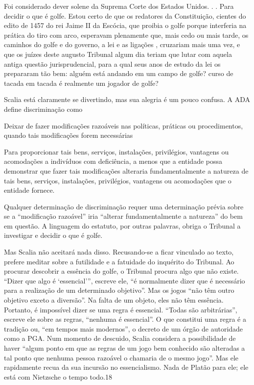  \par 
Foi considerado dever solene da Suprema Corte dos Estados Unidos. . . Para decidir o que é golfe. Estou certo de que os redatores da Constituição, cientes do edito de 1457 do rei Jaime II da Escócia, que proibia o golfe porque interferia na prática do tiro com arco, esperavam plenamente que, mais cedo ou mais tarde, os caminhos do golfe e do governo, a lei e as ligações , cruzariam mais uma vez, e que os juízes deste augusto Tribunal algum dia teriam que lutar com aquela antiga questão jurisprudencial, para a qual seus anos de estudo da lei os prepararam tão bem: alguém está andando em um campo de golfe? curso de tacada em tacada é realmente um jogador de golfe?
 \par 
Scalia está claramente se divertindo, mas sua alegria é um pouco confusa. A ADA define discriminação como
 \par 
Deixar de fazer modificações razoáveis ​​nas políticas, práticas ou procedimentos, quando tais modificações forem necessárias
 \par 
Para proporcionar tais bens, serviços, instalações, privilégios, vantagens ou acomodações a indivíduos com deficiência, a menos que a entidade possa demonstrar que fazer tais modificações alteraria fundamentalmente a natureza de tais bens, serviços, instalações, privilégios, vantagens ou acomodações que o entidade fornece.
 \par 
Qualquer determinação de discriminação requer uma determinação prévia sobre se a “modificação razoável” iria “alterar fundamentalmente a natureza” do bem em questão. A linguagem do estatuto, por outras palavras, obriga o Tribunal a investigar e decidir o que é golfe.
 \par 
Mas Scalia não aceitará nada disso. Recusando-se a ficar vinculado ao texto, prefere meditar sobre a futilidade e a fatuidade do inquérito do Tribunal. Ao procurar descobrir a essência do golfe, o Tribunal procura algo que não existe. “Dizer que algo é ‘essencial’”, escreve ele, “é normalmente dizer que é necessário para a realização de um determinado objetivo”. Mas os jogos “não têm outro objetivo exceto a diversão”. Na falta de um objeto, eles não têm essência. Portanto, é impossível dizer se uma regra é essencial. “Todas são arbitrárias”, escreve ele sobre as regras, “nenhuma é essencial”. O que constitui uma regra é a tradição ou, “em tempos mais modernos”, o decreto de um órgão de autoridade como a PGA. Num momento de descuido, Scalia considera a possibilidade de haver “algum ponto em que as regras de um jogo bem conhecido são alteradas a tal ponto que nenhuma pessoa razoável o chamaria de o mesmo jogo”. Mas ele rapidamente recua da sua incursão no essencialismo. Nada de Platão para ele; ele está com Nietzsche o tempo todo.{\color{blue}18}
